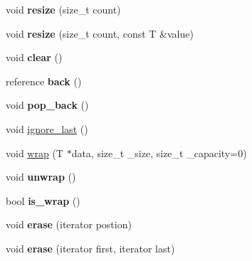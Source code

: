 \begin{DoxyCompactItemize}
\item 
\mbox{\label{classnabla_1_1_s_t_l_vector_ex_a5c67e1289e13c47ca12bfc0df7f4d746}} 
void {\bfseries resize} (size\+\_\+t count)
\item 
\mbox{\label{classnabla_1_1_s_t_l_vector_ex_a86b60bb70244ff2cdcefb10617cc2ec7}} 
void {\bfseries resize} (size\+\_\+t count, const T \&value)
\item 
\mbox{\label{classnabla_1_1_s_t_l_vector_ex_a262bd3464db2aff36aa6bb90dbf5e7ec}} 
void {\bfseries clear} ()
\item 
\mbox{\label{classnabla_1_1_s_t_l_vector_ex_a4fd7e56ad9f737416be66a7556052fc7}} 
reference {\bfseries back} ()
\item 
\mbox{\label{classnabla_1_1_s_t_l_vector_ex_a19db49ea48b8867641ac20722516a7a0}} 
void {\bfseries pop\+\_\+back} ()
\item 
void \mbox{\hyperlink{classnabla_1_1_s_t_l_vector_ex_a8be72171d8b6128e38d0810b27b622d8}{ignore\+\_\+last}} ()
\item 
void \mbox{\hyperlink{classnabla_1_1_s_t_l_vector_ex_a5f3945f5d23d03285551521b69c961fc}{wrap}} (T $\ast$data, size\+\_\+t \+\_\+size, size\+\_\+t \+\_\+capacity=0)
\item 
\mbox{\label{classnabla_1_1_s_t_l_vector_ex_ad48fa767f6d8ea38eeae6a701ac164c3}} 
void {\bfseries unwrap} ()
\item 
\mbox{\label{classnabla_1_1_s_t_l_vector_ex_aec5a21ff75c8076de45e93bb3fcccb13}} 
bool {\bfseries is\+\_\+wrap} ()
\item 
\mbox{\label{classnabla_1_1_s_t_l_vector_ex_ac1a432e5fbeed32ba95a7449afbaaf35}} 
void {\bfseries erase} (iterator postion)
\item 
\mbox{\label{classnabla_1_1_s_t_l_vector_ex_a0234752a3c044126c3f8fbd5a08c0c13}} 
void {\bfseries erase} (iterator first, iterator last)
\end{DoxyCompactItemize}


